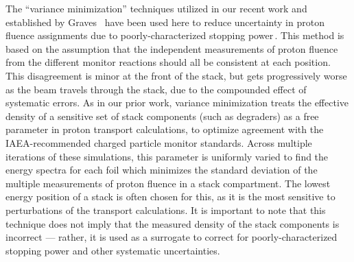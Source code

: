 The \enquote{variance minimization} techniques utilized in our recent work and established by Graves \etal\ have been used here to reduce uncertainty in proton fluence assignments due to poorly-characterized stopping power\,\cite{Voyles2018a,Graves2016}.
This method is based on the assumption that the independent measurements of proton fluence from the different monitor reactions 
should all be consistent at each 
position.
This disagreement is minor at the front of the stack, but gets progressively worse as the beam travels through the stack, due to the compounded effect of systematic errors.
As in  our prior work, variance minimization treats the effective density of a sensitive set of stack components (such as degraders) as a free parameter in proton transport calculations, to optimize agreement with the IAEA-recommended charged particle monitor standards.
Across multiple iterations of these simulations, this parameter is uniformly varied to find the energy spectra for each foil which minimizes the standard deviation  of the multiple measurements of proton fluence in a stack compartment.
The lowest energy position of a stack is often chosen for this, as it is the most sensitive to perturbations of the transport calculations.
It is important to note that this technique does not imply that the measured density of the stack components is incorrect --- rather, it is used as a surrogate to correct for poorly-characterized stopping power and other systematic uncertainties.




